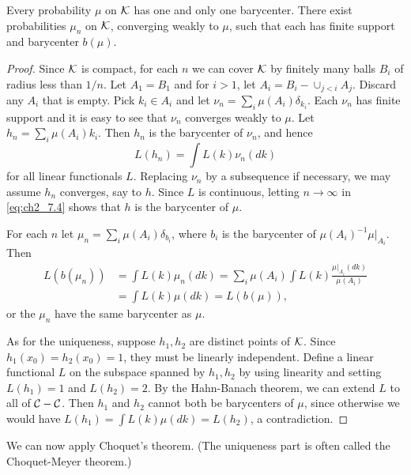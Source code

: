 \begin{proposition}\label{prop:ch2_7.9}
Every probability $\mu$ on $\mathcal{K}$ has one and only one barycenter. There exist probabilities $\mu_n$ on $\mathcal{K}$, converging weakly to $\mu$, such that each has finite support and barycenter $b(\mu)$.
\end{proposition}

\begin{proof}
Since $\mathcal{K}$ is compact, for each $n$ we can cover $\mathcal{K}$ by finitely many balls $B_i$ of radius less than $1/n$. Let $A_1 = B_1$ and for $i > 1$, let $A_i = B_i-\cup_{j<i}A_j$. Discard any $A_i$ that is empty. Pick $k_i \in A_i$ and let $\nu_n = \sum_i \mu(A_i)\delta_{k_i}$. Each $\nu_n$ has finite support and it is easy to see that $\nu_n$ converges weakly to $\mu$. Let $h_n = \sum_i \mu(A_i)k_i$. Then $h_n$ is the barycenter of $\nu_n$, and hence
\begin{equation}\label{eq:ch2_7.4}
    L(h_n) = \int L(k)\nu_n(dk)
\end{equation}
for all linear functionals $L$. Replacing $\nu_n$ by a subsequence if necessary, we may assume $h_n$ converges, say to $h$. Since $L$ is continuous, letting $n \to \infty$ in \eqref{eq:ch2_7.4} shows that $h$ is the barycenter of $\mu$.

For each $n$ let $\mu_n = \sum_i \mu(A_i)\delta_{b_i}$, where $b_i$ is the barycenter of $\mu(A_i)^{-1}\mu|_{A_i}$. Then
\begin{align*}
    L(b(\mu_n)) &= \int L(k)\mu_n(dk) = \sum_i \mu(A_i)\int L(k)\frac{\mu|_{A_i}(dk)}{\mu(A_i)} \\
    &= \int L(k)\mu(dk) = L(b(\mu)),
\end{align*}
or the $\mu_n$ have the same barycenter as $\mu$.

As for the uniqueness, suppose $h_1, h_2$ are distinct points of $\mathcal{K}$. Since $h_1(x_0) = h_2(x_0) = 1$, they must be linearly independent. Define a linear functional $L$ on the subspace spanned by $h_1,h_2$ by using linearity and setting $L(h_1) = 1$ and $L(h_2) = 2$. By the Hahn-Banach theorem, we can extend $L$ to all of $\mathcal{C}-\mathcal{C}$. Then $h_1$ and $h_2$ cannot both be barycenters of $\mu$, since otherwise we would have $L(h_1) = \int L(k)\mu(dk) = L(h_2)$, a contradiction.
\end{proof}

We can now apply Choquet's theorem. (The uniqueness part is often called the Choquet-Meyer theorem.)


